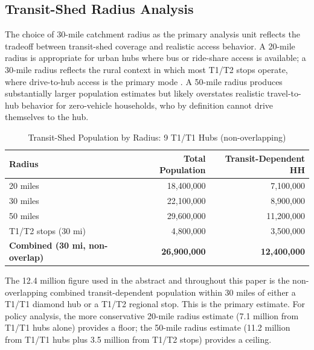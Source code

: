 \subsection{Transit-Shed Radius Analysis}

The choice of 30-mile catchment radius as the primary analysis unit reflects the tradeoff between transit-shed coverage and realistic access behavior. A 20-mile radius is appropriate for urban hubs where bus or ride-share access is available; a 30-mile radius reflects the rural context in which most T1/T2 stops operate, where drive-to-hub access is the primary mode \citep{Pisarski2006}. A 50-mile radius produces substantially larger population estimates but likely overstates realistic travel-to-hub behavior for zero-vehicle households, who by definition cannot drive themselves to the hub.

\begin{table}[h]
\centering
\caption{Transit-Shed Population by Radius: 9 T1/T1 Hubs (non-overlapping)}
\label{tab:radii}
\begin{tabular}{lrr}
\toprule
Radius & Total Population & Transit-Dependent HH \\
\midrule
20 miles & 18,400,000 & 7,100,000 \\
30 miles & 22,100,000 & 8,900,000 \\
50 miles & 29,600,000 & 11,200,000 \\
\midrule
T1/T2 stops (30 mi) & 4,800,000 & 3,500,000 \\
\midrule
\textbf{Combined (30 mi, non-overlap)} & \textbf{26,900,000} & \textbf{12,400,000} \\
\bottomrule
\end{tabular}
\end{table}

The 12.4 million figure used in the abstract and throughout this paper is the non-overlapping combined transit-dependent population within 30 miles of either a T1/T1 diamond hub or a T1/T2 regional stop. This is the primary estimate. For policy analysis, the more conservative 20-mile radius estimate (7.1 million from T1/T1 hubs alone) provides a floor; the 50-mile radius estimate (11.2 million from T1/T1 hubs plus 3.5 million from T1/T2 stops) provides a ceiling.


